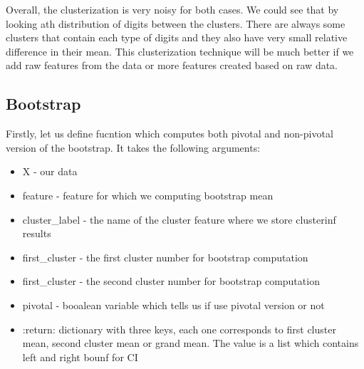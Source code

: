 Overall, the clusterization is very noisy for both cases. We could see
that by looking ath distribution of digits between the clusters. There
are always some clusters that contain each type of digits and they also
have very small relative difference in their mean. This clusterization
technique will be much better if we add raw features from the data or
more features created based on raw data.


\subsection*{Bootstrap}

    Firstly, let us define fucntion which computes both pivotal and
non-pivotal version of the bootstrap. It takes the following arguments:

\begin{itemize}
\item
  X - our data
\item
  feature - feature for which we computing bootstrap mean
\item
  cluster\_label - the name of the cluster feature where we store
  clusterinf results
\item
  first\_cluster - the first cluster number for bootstrap computation
\item
  first\_cluster - the second cluster number for bootstrap computation
\item
  pivotal - booalean variable which tells us if use pivotal version or
  not
\item
  :return: dictionary with three keys, each one corresponds to first
  cluster mean, second cluster mean or grand mean. The value is a list
  which contains left and right bounf for CI
\end{itemize}

